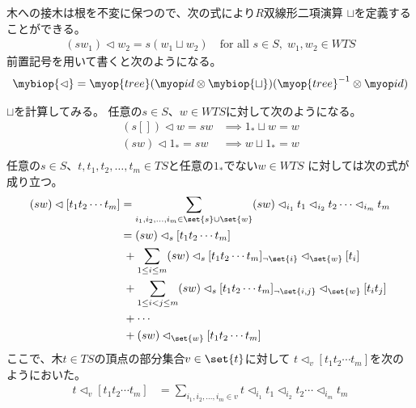 	木への接木は根を不変に保つので、次の式により$R$双線形二項演算
	$\sqcup$を定義することができる。
	\begin{equation}\begin{split} %
		(sw_1)\lhd w_2 = s(w_1\sqcup w_2)\quad\text{for all }s\in S,\;w_1,w_2\in WTS
	\end{split}\end{equation} %
	前置記号を用いて書くと次のようになる。
	\begin{equation}\begin{split} %
		\mybiop{\lhd}
		= \myop{tree}(\myid\otimes\mybiop{\sqcup})(\myop{tree}^{-1}\otimes\myid)
	\end{split}\end{equation} %

	$\sqcup$を計算してみる。
	任意の$s\in S$、$w\in WTS$に対して次のようになる。
	\begin{equation}\begin{split} %
		(s[])\lhd w=sw &\implies 1_*\sqcup w=w \\
		(sw)\lhd 1_*=sw &\implies w\sqcup 1_*=w \\
	\end{split}\end{equation} %
	任意の$s\in S$、$t,t_1,t_2,\dots,t_m\in TS$と任意の$1_*$でない$w\in WTS$
	に対しては次の式が成り立つ。
	\begin{equation}\begin{split} %
		(sw)\lhd[t_1t_2\cdots t_m]
			&= \sum_{i_1,i_2,\dots,i_m\in\set{s}\cup\set{w}}(sw)\lhd_{i_1}t_1\lhd_{i_2}t_2\cdots\lhd_{i_m}t_m \\
			&= (sw)\lhd_{s}[t_1t_2\cdots t_m] \\
			&\;+ \sum_{1\le i\le m}(sw)\lhd_{s}[t_1t_2\cdots t_m]_{\neg\set{i}}\lhd_{\set{w}}[t_i] \\
			&\;+ \sum_{1\le i<j\le m}(sw)\lhd_{s}[t_1t_2\cdots t_m]_{\neg\set{i,j}}\lhd_{\set{w}}[t_it_j] \\
			&\;+ \cdots \\
			&\;+ (sw)\lhd_{\set{w}}[t_1t_2\cdots t_m] \\
	\end{split}\end{equation} %
	ここで、木$t\in TS$の頂点の部分集合$v\in\set{t}$に対して
	$t\lhd_v[t_1t_2\cdots t_m]$を次のようにおいた。
	\begin{equation}\begin{split} %
		t\lhd_v[t_1t_2\cdots t_m] 
		&= \sum_{i_1,i_2,\dots,i_m\in v}t\lhd_{i_1}t_1\lhd_{i_2}t_2\cdots\lhd_{i_m}t_m
	\end{split}\end{equation} %
